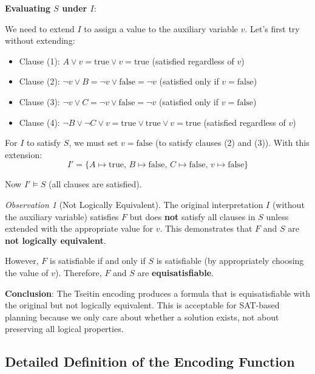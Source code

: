 \documentclass[11pt,a4paper]{article}
\theoremstyle{definition}
\theoremstyle{plain}
\theoremstyle{remark}
\newtheorem*{observation}{Observation}
\begin{document}
\textbf{Evaluating $S$ under $I$}:

We need to extend $I$ to assign a value to the auxiliary variable $v$. Let's first try without extending:

\begin{itemize}
    \item Clause (1): $A \lor v = \text{true} \lor v = \text{true}$ \quad (satisfied regardless of $v$)
    \item Clause (2): $\neg v \lor B = \neg v \lor \text{false} = \neg v$ \quad (satisfied only if $v = \text{false}$)
    \item Clause (3): $\neg v \lor C = \neg v \lor \text{false} = \neg v$ \quad (satisfied only if $v = \text{false}$)
    \item Clause (4): $\neg B \lor \neg C \lor v = \text{true} \lor \text{true} \lor v = \text{true}$ \quad (satisfied regardless of $v$)
\end{itemize}

For $I$ to satisfy $S$, we must set $v = \text{false}$ (to satisfy clauses (2) and (3)). With this extension:
\[
I' = \{A \mapsto \text{true}, \, B \mapsto \text{false}, \, C \mapsto \text{false}, \, v \mapsto \text{false}\}
\]

Now $I' \models S$ (all clauses are satisfied).

\begin{tcolorbox}[colback=teal!10!white,colframe=teal!75!black,title=\textbf{Equisatisfiability vs Logical Equivalence}]
\begin{observation}[Not Logically Equivalent]
The original interpretation $I$ (without the auxiliary variable) satisfies $F$ but does \textbf{not} satisfy all clauses in $S$ unless extended with the appropriate value for $v$. This demonstrates that $F$ and $S$ are \textbf{not logically equivalent}.

However, $F$ is satisfiable if and only if $S$ is satisfiable (by appropriately choosing the value of $v$). Therefore, $F$ and $S$ are \textbf{equisatisfiable}.
\end{observation}
\end{tcolorbox}

\textbf{Conclusion}: The Tseitin encoding produces a formula that is equisatisfiable with the original but not logically equivalent. This is acceptable for SAT-based planning because we only care about whether a solution exists, not about preserving all logical properties.

\subsection{Detailed Definition of the Encoding Function}
\end{document}
